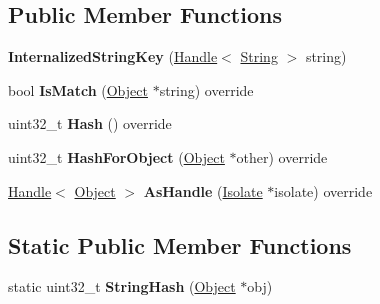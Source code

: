 \subsection*{Public Member Functions}
\begin{DoxyCompactItemize}
\item 
{\bfseries Internalized\+String\+Key} (\hyperlink{classv8_1_1internal_1_1_handle}{Handle}$<$ \hyperlink{classv8_1_1internal_1_1_string}{String} $>$ string)\hypertarget{classv8_1_1internal_1_1_internalized_string_key_aba358506b7265a8c8ac9b75a3d2394aa}{}\label{classv8_1_1internal_1_1_internalized_string_key_aba358506b7265a8c8ac9b75a3d2394aa}

\item 
bool {\bfseries Is\+Match} (\hyperlink{classv8_1_1internal_1_1_object}{Object} $\ast$string) override\hypertarget{classv8_1_1internal_1_1_internalized_string_key_ade94f1971552672477606b2009ebc850}{}\label{classv8_1_1internal_1_1_internalized_string_key_ade94f1971552672477606b2009ebc850}

\item 
uint32\+\_\+t {\bfseries Hash} () override\hypertarget{classv8_1_1internal_1_1_internalized_string_key_a4e9e271906d8fe5d5363fa9962322d5f}{}\label{classv8_1_1internal_1_1_internalized_string_key_a4e9e271906d8fe5d5363fa9962322d5f}

\item 
uint32\+\_\+t {\bfseries Hash\+For\+Object} (\hyperlink{classv8_1_1internal_1_1_object}{Object} $\ast$other) override\hypertarget{classv8_1_1internal_1_1_internalized_string_key_acfa4299145752c38eb221a7949facea7}{}\label{classv8_1_1internal_1_1_internalized_string_key_acfa4299145752c38eb221a7949facea7}

\item 
\hyperlink{classv8_1_1internal_1_1_handle}{Handle}$<$ \hyperlink{classv8_1_1internal_1_1_object}{Object} $>$ {\bfseries As\+Handle} (\hyperlink{classv8_1_1internal_1_1_isolate}{Isolate} $\ast$isolate) override\hypertarget{classv8_1_1internal_1_1_internalized_string_key_a61ddc4bf0c3fe5e28a34c33df0852910}{}\label{classv8_1_1internal_1_1_internalized_string_key_a61ddc4bf0c3fe5e28a34c33df0852910}

\end{DoxyCompactItemize}
\subsection*{Static Public Member Functions}
\begin{DoxyCompactItemize}
\item 
static uint32\+\_\+t {\bfseries String\+Hash} (\hyperlink{classv8_1_1internal_1_1_object}{Object} $\ast$obj)\hypertarget{classv8_1_1internal_1_1_internalized_string_key_a4164f452dfd9d4682a87f20fbea37be8}{}\label{classv8_1_1internal_1_1_internalized_string_key_a4164f452dfd9d4682a87f20fbea37be8}

\end{DoxyCompactItemize}
